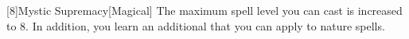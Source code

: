         [8]{Mystic Supremacy}[Magical]
        The maximum spell level you can cast is increased to 8.
        In addition, you learn an additional  that you can apply to nature spells.



